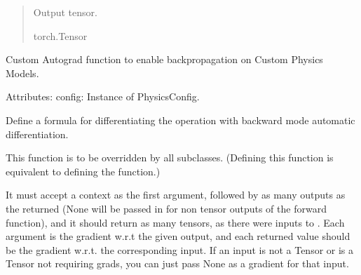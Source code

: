 \documentclass[letterpaper,10pt,english]{sphinxmanual}
\begin{document}
\begin{fulllineitems}
\begin{fulllineitems}
\begin{quote}
\begin{description}
\sphinxAtStartPar
Output tensor.

\sphinxAtStartPar
torch.Tensor

\end{description}\end{quote}

\end{fulllineitems}


\end{fulllineitems}


\begin{fulllineitems}
\label{\detokenize{index:hypyml.models.Physics}}
\pysigstartsignatures
{}
\pysigstopsignatures
\sphinxAtStartPar
Custom Autograd function to enable backpropagation on Custom Physics Models.

\sphinxAtStartPar
Attributes:
config: Instance of PhysicsConfig.

\begin{fulllineitems}
\label{\detokenize{index:hypyml.models.Physics.backward}}
\pysigstartsignatures
{}
\pysigstopsignatures
\sphinxAtStartPar
Define a formula for differentiating the operation with backward mode automatic differentiation.

\sphinxAtStartPar
This function is to be overridden by all subclasses.
(Defining this function is equivalent to defining the  function.)

\sphinxAtStartPar
It must accept a context  as the first argument, followed by
as many outputs as the {\hyperref[\detokenize{index:hypyml.models.Physics.forward}]{}} returned (None will be passed in
for non tensor outputs of the forward function),
and it should return as many tensors, as there were inputs to
{\hyperref[\detokenize{index:hypyml.models.Physics.forward}]{}}. Each argument is the gradient w.r.t the given output,
and each returned value should be the gradient w.r.t. the
corresponding input. If an input is not a Tensor or is a Tensor not
requiring grads, you can just pass None as a gradient for that input.


\end{fulllineitems}
\end{fulllineitems}
\end{document}
